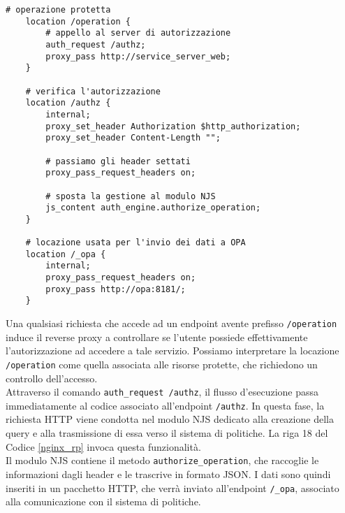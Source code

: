 \lstset{language=nginx}
\begin{lstlisting}[caption={Frammento di codice del reverse proxy},captionpos=b,label=nginx_rp]
    # operazione protetta
    location /operation {
        # appello al server di autorizzazione
        auth_request /authz; 
        proxy_pass http://service_server_web;
    }

    # verifica l'autorizzazione
    location /authz {
        internal;
        proxy_set_header Authorization $http_authorization;
        proxy_set_header Content-Length "";

        # passiamo gli header settati
        proxy_pass_request_headers on; 

        # sposta la gestione al modulo NJS  
        js_content auth_engine.authorize_operation;
    }

    # locazione usata per l'invio dei dati a OPA
    location /_opa {
        internal;
        proxy_pass_request_headers on; 
        proxy_pass http://opa:8181/;
    }
\end{lstlisting}
Una qualsiasi richiesta che accede ad un endpoint avente prefisso \texttt{/operation} induce il reverse proxy a controllare 
se l'utente possiede effettivamente l'autorizzazione ad accedere a tale servizio. Possiamo interpretare la locazione \texttt{/operation}
come quella associata alle risorse protette, che richiedono un controllo dell'accesso. 
\\ Attraverso il comando \texttt{auth\_request /authz},
il flusso d'esecuzione passa immediatamente al codice associato all'endpoint \texttt{/authz}. 
In questa fase, la richiesta HTTP viene condotta nel modulo NJS dedicato alla creazione della query e alla trasmissione di essa verso il sistema di politiche.
La riga 18 del Codice \ref*{nginx_rp} invoca questa funzionalità. \\
Il modulo NJS contiene il metodo \texttt{authorize\_operation}, che raccoglie le informazioni dagli header 
e le trascrive in formato JSON.
I dati sono quindi inseriti in un pacchetto HTTP, che verrà inviato all'endpoint \texttt{/\_opa}, 
 associato alla comunicazione con il sistema di politiche.
\lstset{language=nginx}
